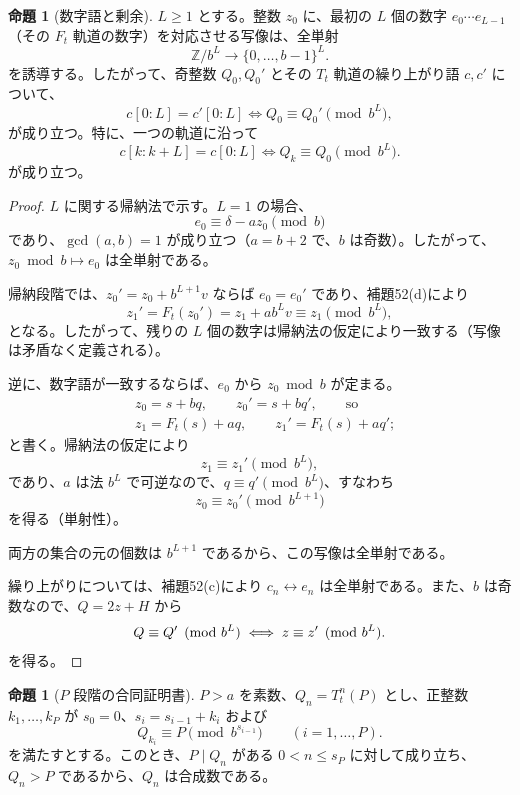 \documentclass[11pt,reqno]{amsart}
\theoremstyle{definition}
\newtheorem{proposition}[theorem]{命題}
\theoremstyle{definition}
\theoremstyle{remark}
\begin{document}
\begin{samepage}
\begin{proposition}[数字語と剰余]\leavevmode\label{thm:53}
\(L\ge1\) とする。整数 \(z_0\) に、最初の \(L\) 個の数字 \(e_0\cdots e_{L-1}\)（その \(F_t\) 軌道の数字）を対応させる写像は、全単射
\[
\mathbb Z/b^L\to\{0,\ldots,b-1\}^L.
\]
を誘導する。したがって、奇整数 \(Q_0,Q_0'\) とその \(T_t\) 軌道の繰り上がり語 \(c,c'\) について、
\[
c[0:L]=c'[0:L]\iff Q_0\equiv Q_0'\pmod{b^L},
\]
が成り立つ。特に、一つの軌道に沿って
\[
c[k:k+L]=c[0:L]\iff Q_k\equiv Q_0\pmod{b^L}.
\]
が成り立つ。
\label{thm-end:53}
\end{proposition}
\end{samepage}

\begin{proof}\leavevmode\label{proof:53}
\(L\) に関する帰納法で示す。\(L=1\) の場合、
\[
e_0\equiv\delta-az_0\pmod b
\]
であり、\(\gcd(a,b)=1\) が成り立つ（\(a=b+2\) で、\(b\) は奇数）。したがって、\(z_0\bmod b\mapsto e_0\) は全単射である。

帰納段階では、\(z_0'=z_0+b^{L+1}v\) ならば \(e_0=e_0'\) であり、補題52(d)により
\[
z_1'=F_t(z_0')=z_1+ab^Lv\equiv z_1\pmod{b^L},
\]
となる。したがって、残りの \(L\) 個の数字は帰納法の仮定により一致する（写像は矛盾なく定義される）。

逆に、数字語が一致するならば、\(e_0\) から \(z_0\bmod b\) が定まる。
\[
\begin{aligned}
&z_0=s+bq,\qquad z_0'=s+bq',\qquad\text{so}\\
&z_1=F_t(s)+aq,\qquad z_1'=F_t(s)+aq';
\end{aligned}
\]
と書く。帰納法の仮定により
\[
z_1\equiv z_1'\pmod{b^L},
\]
であり、\(a\) は法 \(b^L\) で可逆なので、\(q\equiv q'\pmod{b^L}\)、すなわち
\[
z_0\equiv z_0'\pmod{b^{L+1}}
\]
を得る（単射性）。

両方の集合の元の個数は \(b^{L+1}\) であるから、この写像は全単射である。

繰り上がりについては、補題52(c)により \(c_n\leftrightarrow e_n\) は全単射である。また、\(b\) は奇数なので、\(Q=2z+H\) から
\[
Q\equiv Q'\pmod{b^L}\iff z\equiv z'\pmod{b^L}.\qedhere
\]
を得る。
\end{proof}

\begin{samepage}
\begin{proposition}[\(P\) 段階の合同証明書]\leavevmode\label{thm:54}
\(P>a\) を素数、\(Q_n=T_t^n(P)\) とし、正整数
\(k_1,\ldots,k_P\) が \(s_0=0\)、\(s_i=s_{i-1}+k_i\) および
\[
Q_{k_i}\equiv P\pmod{b^{s_{i-1}}}\qquad(i=1,\ldots,P).
\tag{33}\label{eq:33}
\]
を満たすとする。このとき、\(P\mid Q_n\) がある \(0<n\le s_P\) に対して成り立ち、\(Q_n>P\) であるから、\(Q_n\) は合成数である。
\label{thm-end:54}
\end{proposition}
\end{samepage}
\end{document}

